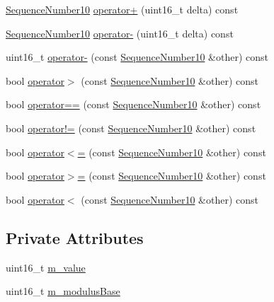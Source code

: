 \begin{DoxyCompactItemize}
\item 
\hyperlink{classns3_1_1SequenceNumber10}{Sequence\+Number10} \hyperlink{classns3_1_1SequenceNumber10_a3173de1c4197d684d7b83b9203dbe0e7}{operator+} (uint16\+\_\+t delta) const 
\item 
\hyperlink{classns3_1_1SequenceNumber10}{Sequence\+Number10} \hyperlink{classns3_1_1SequenceNumber10_add74b7ee5f9f928ae631c44883da05a3}{operator-\/} (uint16\+\_\+t delta) const 
\item 
uint16\+\_\+t \hyperlink{classns3_1_1SequenceNumber10_a1e6e1e84afde9df81e76d79f001d8d39}{operator-\/} (const \hyperlink{classns3_1_1SequenceNumber10}{Sequence\+Number10} \&other) const 
\item 
bool \hyperlink{classns3_1_1SequenceNumber10_a103508804980047874e1f32684868d3d}{operator$>$} (const \hyperlink{classns3_1_1SequenceNumber10}{Sequence\+Number10} \&other) const 
\item 
bool \hyperlink{classns3_1_1SequenceNumber10_aaa5e61a0f23605f0e5e8a29813e2127b}{operator==} (const \hyperlink{classns3_1_1SequenceNumber10}{Sequence\+Number10} \&other) const 
\item 
bool \hyperlink{classns3_1_1SequenceNumber10_aa8bd97ed1bed616fb2b98fada41786ff}{operator!=} (const \hyperlink{classns3_1_1SequenceNumber10}{Sequence\+Number10} \&other) const 
\item 
bool \hyperlink{classns3_1_1SequenceNumber10_a4b2139836c2f68d679d40675ed062fe6}{operator$<$=} (const \hyperlink{classns3_1_1SequenceNumber10}{Sequence\+Number10} \&other) const 
\item 
bool \hyperlink{classns3_1_1SequenceNumber10_a551e70a749bd3516616dd18cd7a1462d}{operator$>$=} (const \hyperlink{classns3_1_1SequenceNumber10}{Sequence\+Number10} \&other) const 
\item 
bool \hyperlink{classns3_1_1SequenceNumber10_a387cc7f1cb4b7c56089f915a8ecf696f}{operator$<$} (const \hyperlink{classns3_1_1SequenceNumber10}{Sequence\+Number10} \&other) const 
\end{DoxyCompactItemize}
\subsection*{Private Attributes}
\begin{DoxyCompactItemize}
\item 
uint16\+\_\+t \hyperlink{classns3_1_1SequenceNumber10_a7bb01e339a81919cb8a512463642b706}{m\+\_\+value}
\item 
uint16\+\_\+t \hyperlink{classns3_1_1SequenceNumber10_a11de14d3e00ef8e8c9f7be7d8ad7d41f}{m\+\_\+modulus\+Base}
\end{DoxyCompactItemize}
